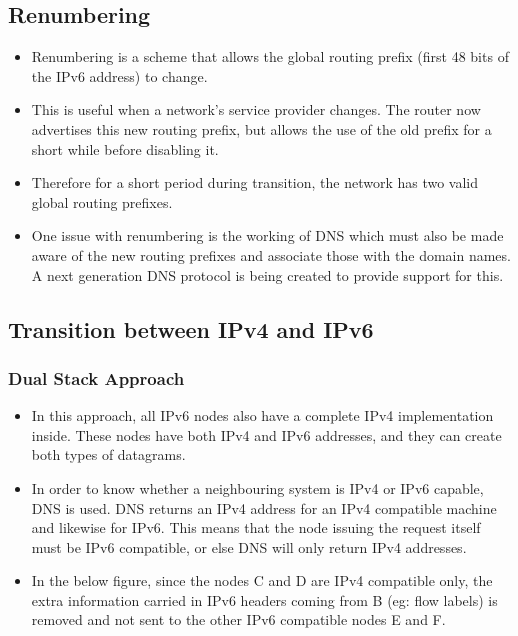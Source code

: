 \documentclass[a4paper]{article}
\theoremstyle{plain}
\theoremstyle{definition}
\begin{document}
\subsection{Renumbering}
\begin{itemize}
    \item Renumbering is a scheme that allows the global routing prefix (first 48 bits of the IPv6 address) to change. 
    
    \item This is useful when a network's service provider changes. The router now advertises this new routing prefix, but allows the use of the old prefix for a short while before disabling it. 
    
    \item Therefore for a short period during transition, the network has two valid global routing prefixes. 
    
    \item One issue with renumbering is the working of DNS which must also be made aware of the new routing prefixes and associate those with the domain names. A next generation DNS protocol is being created to provide support for this. 
\end{itemize}

\subsection{Transition between IPv4 and IPv6}
\subsubsection{Dual Stack Approach}
\begin{itemize}
    \item In this approach, all IPv6 nodes also have a complete IPv4 implementation inside. These nodes have both IPv4 and IPv6 addresses, and they can create both types of datagrams. 
    
    \item In order to know whether a neighbouring system is IPv4 or IPv6 capable, DNS is used. DNS returns an IPv4 address for an IPv4 compatible machine and likewise for IPv6. This means that the node issuing the request itself must be IPv6 compatible, or else DNS will only return IPv4 addresses. 
    
    \item In the below figure, since the nodes C and D are IPv4 compatible only, the extra information carried in IPv6 headers coming from B (eg: flow labels) is removed and not sent to the other IPv6 compatible nodes E and F. 
\end{itemize}
\end{document}
